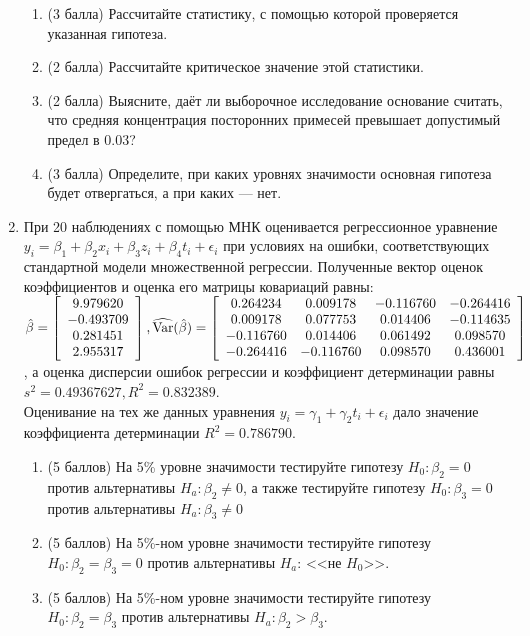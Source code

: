 \documentclass[pdftex,12pt,a4paper]{article}
\begin{document}
\begin{enumerate}
\begin{enumerate}
\item (3 балла) Рассчитайте статистику, с помощью которой проверяется указанная гипотеза.
\item (2 балла) Рассчитайте критическое значение этой статистики.
\item (2 балла) Выясните, даёт ли выборочное исследование основание считать, что средняя концентрация посторонних примесей превышает допустимый предел в 0.03?
\item (3 балла) Определите, при каких уровнях значимости основная гипотеза будет отвергаться, а при каких --- нет.
\end{enumerate}
\item При 20 наблюдениях с помощью МНК оценивается регрессионное уравнение $y_i=\beta_1+\beta_2 x_i+\beta_3 z_i+\beta_4 t_i+\epsilon_i$ при условиях на ошибки, соответствующих стандартной модели множественной регрессии. Полученные вектор оценок коэффициентов и оценка его матрицы ковариаций равны:\\
$\hat{\beta}=\left[ \begin{array}{c}
9.979620\\
-0.493709\\
0.281451\\
2.955317
\end{array}\right],
\widehat{\operatorname{Var}}(\hat{\beta})=\left[\begin{array}{cccc}
0.264234 & 0.009178 & -0.116760 & -0.264416\\
0.009178 & 0.077753 & 0.014406 & -0.114635\\
-0.116760 & 0.014406 & 0.061492 & 0.098570\\
-0.264416 & -0.116760 & 0.098570 & 0.436001
\end{array}\right]$\\, а оценка дисперсии ошибок регрессии и коэффициент детерминации равны $s^2=0.49367627, R^2=0.832389$.\\ 
Оценивание на тех же данных уравнения $y_i=\gamma_1+\gamma_2 t_i+\epsilon_i$ дало значение коэффициента детерминации $R^2=0.786790$.
\begin{enumerate}
\item (5 баллов) На 5\% уровне значимости тестируйте гипотезу $H_0:\beta_2=0$ против альтернативы $H_a: \beta_2 \ne 0$, а также тестируйте гипотезу $H_0:\beta_3=0$ против альтернативы $H_a: \beta_3 \ne 0$
\item (5 баллов) На 5\%-ном уровне значимости тестируйте гипотезу $H_0:\beta_2=\beta_3=0$ против альтернативы $H_a$: <<не $H_0$>>.
\item (5 баллов) На 5\%-ном уровне значимости тестируйте гипотезу $H_0:\beta_2=\beta_3$ против альтернативы $H_a: \beta_2>\beta_3$.
\end{enumerate}
\end{enumerate}
\end{document}
